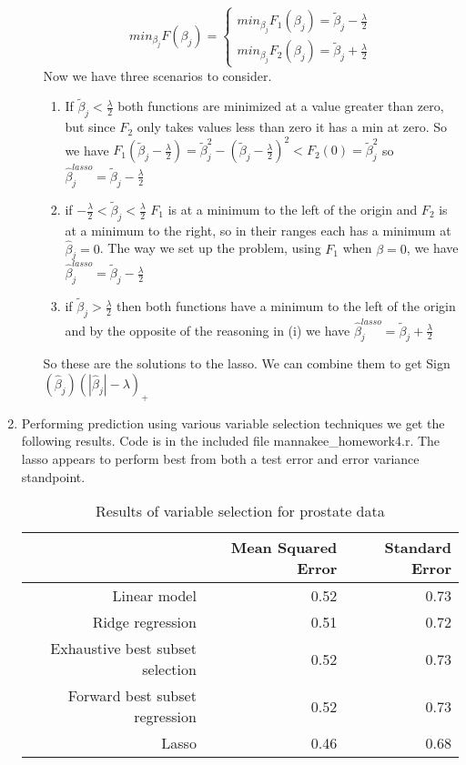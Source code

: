 \documentclass{article}
\begin{document}
\begin{enumerate}
\begin{enumerate}
        $$
        min_{\beta_j}F(\beta_j) = \left\{ \begin{array}{l} min_{\beta_j}F_1(\beta_j) = \tilde{\beta}_j - \frac{\lambda}{2}\\
                                          min_{\beta_j}F_2(\beta_j) = \tilde{\beta}_j + \frac{\lambda}{2}
                        \end{array}
                        \right.
        $$
        Now we have three scenarios to consider. 
          \begin{enumerate}
            \item If $\tilde{\beta}_j < \frac{\lambda}{2}$ both functions are minimized at a value greater than zero, but since $F_2$ only takes values less than zero it has a min at zero. So we have $F_1(\tilde{\beta}_j - \frac{\lambda}{2}) = \tilde{\beta}_j^2 - (\tilde{\beta}_j - \frac{\lambda}{2})^2 < F_2(0) = \tilde{\beta}_j^2$ so $\hat{\beta}_j^{lasso} = \tilde{\beta}_j - \frac{\lambda}{2}$
            \item if $-\frac{\lambda}{2} < \tilde{\beta}_j < \frac{\lambda}{2}$ $F_1$ is at a minimum to the left of the origin and $F_2$ is at a minimum to the right, so in their ranges each has a minimum at $\hat{\beta}_j = 0$. The way we set up the problem, using $F_1$ when $\beta = 0$, we have $\hat{\beta}_j^{lasso} = \tilde{\beta}_j - \frac{\lambda}{2}$
            \item if $\tilde{\beta}_j > \frac{\lambda}{2}$ then both functions have a minimum to the left of the origin and by the opposite of the reasoning in (i) we have $\hat{\beta}_j^{lasso} = \tilde{\beta}_j + \frac{\lambda}{2}$
          \end{enumerate}
          So these are the solutions to the lasso. We can combine them to get Sign$(\hat{\beta}_j)(|\hat{\beta}_j| - \lambda)_+$
      \end{enumerate}
      \item Performing prediction using various variable selection techniques we get the following results. Code is in the included file mannakee\_homework4.r. The lasso appears to perform best from both a test error and error variance standpoint.
      
\begin{table}[ht]
\centering
\begin{tabular}{rrr}
  \hline
 & Mean Squared Error & Standard Error \\ 
  \hline
Linear model & 0.52 & 0.73 \\ 
  Ridge regression & 0.51 & 0.72 \\ 
  Exhaustive best subset selection & 0.52 & 0.73 \\ 
  Forward best subset regression & 0.52 & 0.73 \\ 
  Lasso & 0.46 & 0.68 \\ 
   \hline
\end{tabular}
\caption{Results of variable selection for prostate data}
\end{table}\end{enumerate}
\end{document}
